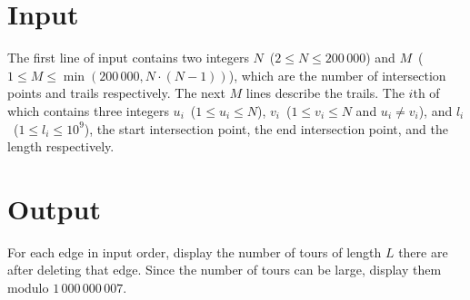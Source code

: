\section*{Input}

The first line of input contains two integers $N$~($2 \leq N \leq 200\,000$) and $M$~($1 \leq M \leq \min(200\,000, N \cdot (N-1))$), which are the number of intersection points and trails respectively. The next $M$ lines describe the trails. The $i$th of which contains three integers $u_i$~($1 \leq u_i \leq N$), $v_i$~($1 \leq v_i \leq N$ and $u_i \neq v_i$), and $l_i$~($1 \leq l_i \leq 10^9$), the start intersection point, the end intersection point, and the length respectively.


\section*{Output}

For each edge in input order, display the number of tours of length $L$ there are after deleting that edge. Since the number of tours can be large, display them modulo $1\,000\,000\,007$.

